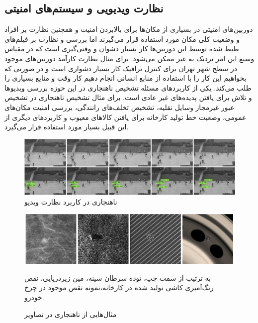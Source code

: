 \documentclass[12pt,a4paper]{report}
\theoremstyle{definition}
\theoremstyle{definition}
\begin{document}
\subsection{نظارت ویدیویی و سیستم‌های امنیتی}
دوربین‌های امنیتی در بسیاری از مکان‌ها برای بالابردن امنیت و همچنین نظارت بر افراد و وضعیت کلی مکان مورد استفاده قرار می‌گیرند اما بررسی و نظارت بر فیلم‌های ظبط شده توسط این دوربین‌ها کار بسیار دشوان و وقتی‌گیری است که در مقیاس وسیع این امر نزدیک به غیر ممکن می‌شود. برای مثال نظارت کار‌آمد دوربین‌های موجود در سطح شهر تهران برای کنترل ترافیک کار بسیار دشواری است و در صورتی که بخواهیم این کار را با استفاده از منابع انسانی انجام دهیم کار وقت و منابع بسیاری را طلب می‌کند. یکی از کاربرد‌های مسئله تشخیص ناهنجاری در این حوزه بررسی ویدیو‌ها و تلاش برای یافتن پدیده‌های غیر عادی است. برای مثال تشخیص ناهنجاری در تشخیص عبور غیرمجاز وسایل نقلیه، تشخیص تخلف‌های رانندگی، بررسی امنیت مکان‌های عمومی، وضعیت خط تولید کارخانه برای یافتن کالاهای معیوب و کاربرد‌های دیگری از این قبیل بسیار مورد استفاده قرار می‌گیرد.
\begin{figure}[!hp]
	\begin{center}
		\includegraphics[width=\linewidth]{./images/figures/walkway-anomaly.png}
		\caption{ناهنجاری در کاربرد نظارت ویدیو~\cite{10.1016/j.compeleceng.2019.02.017}}
		\label{fig:walkway-anomaly}
	\end{center}
\end{figure}

\begin{figure}[!hp]
	\begin{center}
		\includegraphics[width=\linewidth]{./images/figures/image-anomaly-examples-1.png}
		\caption*{به ترتیب از سمت چپ، توده سرطان سینه، مین زیر‌دریایی، نقص رنگ‌آمیزی کاشی تولید شده در کارخانه،نمونه نقص موجود در چرخ خودرو.}
		\caption{
		مثال‌هایی از ناهنجاری در تصاویر
		\cite{T.Ehret}
		}		
		\label{fig:anomaly-example-1}
		\centering
	\end{center}
\end{figure}
\end{document}
